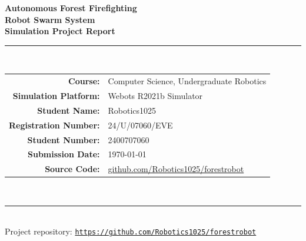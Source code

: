 \documentclass[11pt,a4paper]{article}
\begin{document}

\begin{titlepage}
  \centering
  \vspace*{2cm}

  {\Huge\bfseries\color{fireRed} Autonomous Forest Firefighting\\ Robot Swarm System}\\[1.5em]
  {\Large\bfseries Simulation Project Report}\\[2.5em]

  \rule{\linewidth}{1pt}\\[1.5em]

  \begin{tabular}{r l}
    \textbf{Course:}               & Computer Science, Undergraduate Robotics \\[0.5em]
    \textbf{Simulation Platform:}  & Webots R2021b Simulator \\[0.5em]
    \textbf{Student Name:}         & Robotics1025 \\[0.5em]
    \textbf{Registration Number:}  & 24/U/07060/EVE \\[0.5em]
    \textbf{Student Number:}       & 2400707060 \\[0.5em]
    \textbf{Submission Date:}      & \today \\[0.5em]
    \textbf{Source Code:}          & \href{https://github.com/Robotics1025/forestrobot}{github.com/Robotics1025/forestrobot} \\
  \end{tabular}\\[2em]

  \rule{\linewidth}{1pt}\\[1.5em]

  {\small Project repository: \href{https://github.com/Robotics1025/forestrobot}{\texttt{https://github.com/Robotics1025/forestrobot}}}\\[1em]

  \begin{abstract}
    This report details the implementation of an autonomous, heterogeneous robot team designed to detect, navigate toward, and suppress wildfires in a simulated forest environment. The system integrates two Mavic 2 Pro quadcopter drones and a Spot legged ground robot, coordinated via a centralized communication pipeline. By mapping visual cues using OpenCV HSV masking and executing path planning with A* search on inflated occupancy grids, the team ensures rapid intervention under dynamic wind conditions. The complete software architecture, controller algorithms, verification tests, and simulation results are presented, showing a 100\% extinction success rate with a primary fire response time of approximately 66 seconds.
  \end{abstract}

\end{titlepage}
\end{document}
